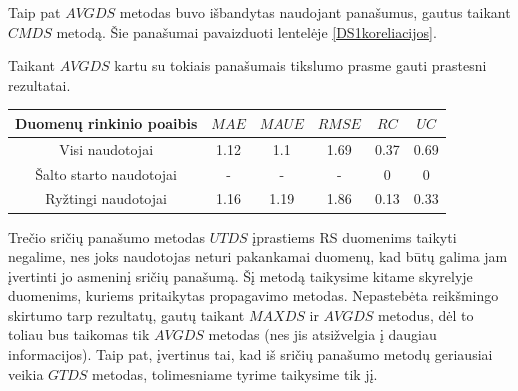 \documentclass{VUMIFInfMagistrinis}
\begin{document}
\indent
Taip pat $AVGDS$ metodas buvo išbandytas naudojant panašumus, gautus taikant $CMDS$ metodą. Šie panašumai pavaizduoti lentelėje \ref{DS1koreliacijos}.

\indent 
Taikant $AVGDS$ kartu su tokiais panašumais tikslumo prasme gauti prastesni rezultatai. 
\begin{center}
	\begin{tabular}{||c c c c c c ||} 
		Duomenų rinkinio poaibis  & $MAE$ & $MAUE$ & $RMSE$ & $RC$ & $UC$ \\
		\hline
		Visi naudotojai & 1.12 & 1.1 & 1.69 & 0.37 & 0.69 \\
		\hline
		Šalto starto naudotojai & - & - & - & 0 & 0 \\
		\hline
		Ryžtingi naudotojai & 1.16 & 1.19 & 1.86 & 0.13 & 0.33 \\
	\end{tabular}
\end{center}
\indent
Trečio sričių panašumo metodas $UTDS$ įprastiems RS duomenims taikyti negalime, nes joks naudotojas neturi pakankamai duomenų, kad būtų galima jam įvertinti jo asmeninį sričių panašumą. Šį metodą taikysime kitame skyrelyje duomenims, kuriems pritaikytas propagavimo metodas.
\newline
\indent
Nepastebėta reikšmingo skirtumo tarp rezultatų, gautų taikant $MAXDS$ ir $AVGDS$ metodus, dėl to toliau  bus taikomas tik $AVGDS$ metodas (nes jis atsižvelgia į daugiau informacijos). Taip pat, įvertinus tai, kad iš sričių panašumo metodų geriausiai veikia $GTDS$ metodas, tolimesniame tyrime taikysime tik jį.
\newline
\indent
\end{document}
